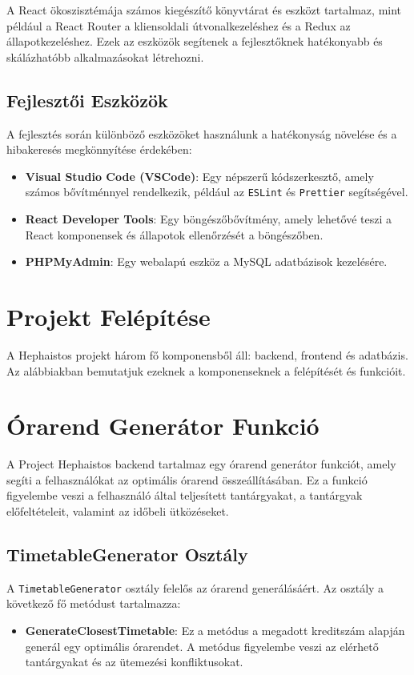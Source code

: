 \documentclass[colorlinks]{thesis-kando}
\theoremstyle{definition}
\theoremstyle{remark}
\begin{document}
A React ökoszisztémája számos kiegészítő könyvtárat és eszközt tartalmaz, mint például a React Router a kliensoldali útvonalkezeléshez és a Redux az állapotkezeléshez. Ezek az eszközök segítenek a fejlesztőknek hatékonyabb és skálázhatóbb alkalmazásokat létrehozni.

\subsection{Fejlesztői Eszközök}
A fejlesztés során különböző eszközöket használunk a hatékonyság növelése és a hibakeresés megkönnyítése érdekében:
\begin{itemize}
    \item \textbf{Visual Studio Code (VSCode)}: Egy népszerű kódszerkesztő, amely számos bővítménnyel rendelkezik, például az \texttt{ESLint} és \texttt{Prettier} segítségével.
    \item \textbf{React Developer Tools}: Egy böngészőbővítmény, amely lehetővé teszi a React komponensek és állapotok ellenőrzését a böngészőben.
    \item \textbf{PHPMyAdmin}: Egy webalapú eszköz a MySQL adatbázisok kezelésére.
\end{itemize}

\section{Projekt Felépítése}
A Hephaistos projekt három fő komponensből áll: backend, frontend és adatbázis. Az alábbiakban bemutatjuk ezeknek a komponenseknek a felépítését és funkcióit.

\section{Órarend Generátor Funkció}
A Project Hephaistos backend tartalmaz egy órarend generátor funkciót, amely segíti a felhasználókat az optimális órarend összeállításában. Ez a funkció figyelembe veszi a felhasználó által teljesített tantárgyakat, a tantárgyak előfeltételeit, valamint az időbeli ütközéseket.

\subsection{TimetableGenerator Osztály}
A \texttt{TimetableGenerator} osztály felelős az órarend generálásáért. Az osztály a következő fő metódust tartalmazza:

\begin{itemize}
    \item \textbf{GenerateClosestTimetable}: Ez a metódus a megadott kreditszám alapján generál egy optimális órarendet. A metódus figyelembe veszi az elérhető tantárgyakat és az ütemezési konfliktusokat.
\end{itemize}
\end{document}
